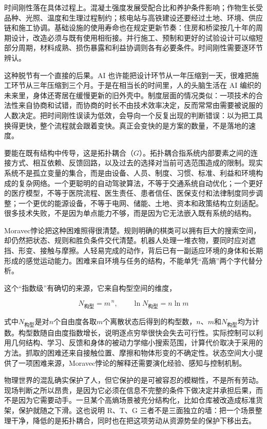 时间刚性落在具体过程上。混凝土强度发展受配合比和养护条件影响；作物生长受品种、光照、温度和生理过程制约；核电站与高铁建设还要经过土地、环境、供应链和施工协调。基础设施的使用寿命也在规定更新节奏：住房和桥梁按几十年的周期设计\cite{miatto2017how}，改造必须与既有使用相衔接。并行施工、预制和更好的试验设计可以缩短部分周期，材料成熟、损伤暴露和利益协调则各有必要条件。时间刚性需要逐环节辨认。

这种脱节有一个直接的后果。AI 也许能把设计环节从一年压缩到一天，很难把施工环节从三年压缩到三个月。于是在相当长的时间里，人的头脑生活在 AI 编织的未来里，身体还寄居在缓慢更新的旧外壳中。制度层面的情况类似：一项技术的合法性来自协商和试错，而协商的时长不由技术效率决定，反而常常由需要被说服的人数决定。把时间刚性误读为低效，会导向一个反复出现的判断错误：以为把工具换得更快，整个流程就会跟着变快。真正会变快的是方案的数量，不是落地的速度。


要能在既有结构中传导，这是拓扑耦合（$G$）。拓扑耦合指系统内部要素之间的连接方式、相互依赖、反馈回路，以及过去的选择对当前可选范围造成的限制。现实系统不是孤立变量的集合，而是由设备、人员、制度、习惯、标准、利益和环境构成的复杂网络。一个更聪明的自动驾驶算法，不等于交通系统自动优化；一个更好的医疗模型，不等于医院流程、医生责任、患者信任、医保支付和法律制度同步调整；一个更优的能源设备，不等于电网、储能、土地、资本和政策结构立刻适配。很多技术失败，不是因为单点能力不够，而是因为它无法嵌入既有系统的结构。

Moravec悖论把这种困难照得很清楚。规则明确的棋类可以拥有巨大的搜索空间，却仍然把状态、规则和胜负条件交代清楚。机器人处理一堆衣物，要同时应对遮挡、形变、接触与摩擦。人轻易完成的动作，背后已有一副适应环境的身体和长期形成的感觉运动能力。困难来自环境与任务的结构，不能单凭“高熵”两个字代替分析。

这个“指数级”有确切的来源，它来自构型空间的维度，

\begin{equation}
N_{\text{构型}}=m^{\,n},
\qquad
\ln N_{\text{构型}}=n\ln m
\end{equation}

式中$N_{\text{构型}}$是对$n$个自由度各取$m$个离散状态后得到的构型数，$n$、$m$和$N_{\text{构型}}$均为计数。构型数随自由度指数增长，说明逐点穷举很快会失去可行性。实际控制可以利用几何结构、学习、反馈和身体的被动力学缩小搜索范围，计算代价取决于采用的方法。抓取的困难还来自接触位置、摩擦和物体形变的不确定性。状态空间大小提供了一项困难来源，Moravec悖论的解释还需要演化经验、感知与控制机制。

物理世界的混乱确实保护了人，但它保护的是可被容忍的模糊性，不是所有劳动。现场判断之所以昂贵，是因为它必须在信息不完整的条件下做决定并承担后果，而不是因为它需要动手。一旦某个高熵场景被充分结构化，比如仓库被改造成标准货架，保护就随之下滑。这也说明 R、T、G 三者不是三面独立的墙：把一个场景整理干净，降低的是拓扑耦合，同时也在把这项劳动从资源势垒的保护下移出去。

